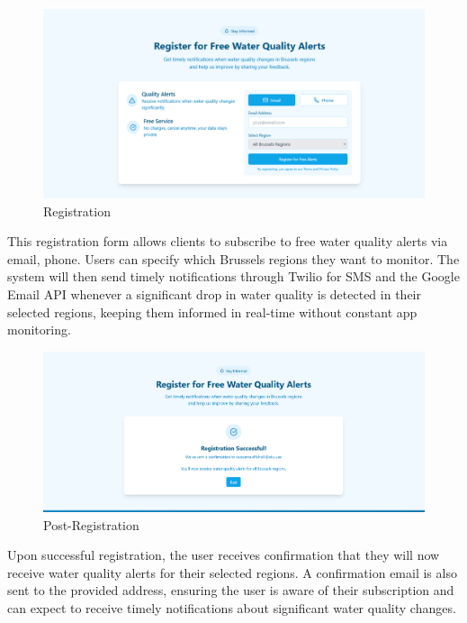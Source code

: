 \begin{figure}[H]
    \centering
    \includegraphics[width=0.75\linewidth]{Figures/clientpart8.png}
    \caption{Registration}
    \label{fig:enter-label}
\end{figure}
This registration form allows clients to subscribe to free water quality alerts via email, phone. Users can specify which Brussels regions they want to monitor. The system will then send timely notifications through Twilio for SMS and the Google Email API whenever a significant drop in water quality is detected in their selected regions, keeping them informed in real-time without constant app monitoring.
\begin{figure}[H]
    \centering
    \includegraphics[width=0.75\linewidth]{Figures/Clientpartfinal.png}
    \caption{Post-Registration}
    \label{fig:enter-label}
\end{figure}
Upon successful registration, the user receives confirmation that they will now receive water quality alerts for their selected regions. A confirmation email is also sent to the provided address, ensuring the user is aware of their subscription and can expect to receive timely notifications about significant water quality changes.
